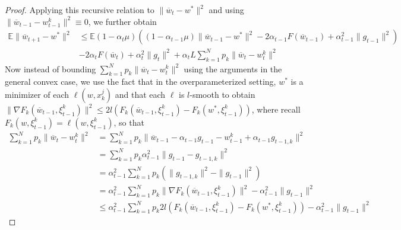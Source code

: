 \begin{proof}
	Applying this recursive relation to $\|\overline{w}_{t}-w^{\ast}\|^{2}$
	and using $\|\overline{w}_{t-1}-w_{t-1}^{k}\|^{2}\equiv0$, we further
	obtain 
	\begin{align*}
	\mathbb{E}\|\overline{w}_{t+1}-w^{\ast}\|^{2} & \leq\mathbb{E}(1-\alpha_{t}\mu)\left((1-\alpha_{t-1}\mu)\|\overline{w}_{t-1}-w^{\ast}\|^{2}-2\alpha_{t-1}F(\overline{w}_{t-1})+\alpha_{t-1}^{2}\|g_{t-1}\|^{2}\right)\\
	& -2\alpha_{t}F(\overline{w}_{t})+\alpha_{t}^{2}\|g_{t}\|^{2}+\alpha_{t}L\sum_{k=1}^{N}p_{k}\|\overline{w}_{t}-w_{t}^{k}\|^{2}
	\end{align*}
	Now instead of bounding $\sum_{k=1}^{N}p_{k}\|\overline{w}_{t}-w_{t}^{k}\|^{2}$
	using the arguments in the general convex case, we use the fact that
	in the overparameterized setting, $w^{\ast}$ is a minimizer of each
	$\ell(w,x_{k}^{j})$ and that each $\ell$ is $l$-smooth to obtain
	$\|\nabla F_{k}(\overline{w}_{t-1},\xi_{t-1}^{k})\|^{2}\leq2l(F_{k}(\overline{w}_{t-1},\xi_{t-1}^{k})-F_{k}(w^{\ast},\xi_{t-1}^{k}))$,
	where recall $F_{k}(w,\xi_{t-1}^{k})=\ell(w,\xi_{t-1}^{k})$, so that
	\begin{align*}
	\sum_{k=1}^{N}p_{k}\|\overline{w}_{t}-w_{t}^{k}\|^{2} & =\sum_{k=1}^{N}p_{k}\|\overline{w}_{t-1}-\alpha_{t-1}g_{t-1}-w_{t-1}^{k}+\alpha_{t-1}g_{t-1,k}\|^{2}\\
	& =\sum_{k=1}^{N}p_{k}\alpha_{t-1}^{2}\|g_{t-1}-g_{t-1,k}\|^{2}\\
	& =\alpha_{t-1}^{2}\sum_{k=1}^{N}p_{k}(\|g_{t-1,k}\|^{2}-\|g_{t-1}\|^{2})\\
	& =\alpha_{t-1}^{2}\sum_{k=1}^{N}p_{k}\|\nabla F_{k}(\overline{w}_{t-1},\xi_{t-1}^{k})\|^{2}-\alpha_{t-1}^{2}\|g_{t-1}\|^{2}\\
	& \le\alpha_{t-1}^{2}\sum_{k=1}^{N}p_{k}2l(F_{k}(\overline{w}_{t-1},\xi_{t-1}^{k})-F_{k}(w^{\ast},\xi_{t-1}^{k}))-\alpha_{t-1}^{2}\|g_{t-1}\|^{2}
	\end{align*}
	\begin{comment}
	(In the Nesterov case)
	\begin{align*}
	\mathbf{v}_{t+1}^{k} & =\mathbf{w}_{t}^{k}-\alpha_{t}\mathbf{g}_{t,k}\\
	\mathbf{w}_{t+1}^{k} & =\begin{cases}
	\mathbf{v}_{t+1}^{k}+\beta_{t}(\mathbf{v}_{t+1}^{k}-\mathbf{v}_{t}^{k}) & \text{if }t+1\notin\mathcal{I}_{E}\\
	\sum_{k=1}^{N}p_{k}\left[\mathbf{v}_{t+1}^{k}+\beta_{t}(\mathbf{v}_{t+1}^{k}-\mathbf{v}_{t}^{k})\right] & \text{if }t+1\in\mathcal{I}_{E}

\end{comment}
\end{proof}
